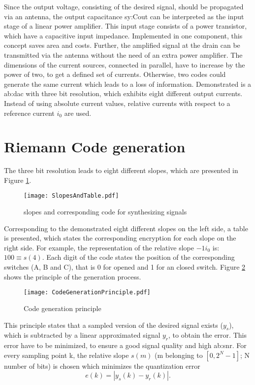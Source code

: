 Since the output voltage, consisting of the desired signal, should be propagated via an antenna, the output capacitance \gls{sy:Cout} can be interpreted as the input stage of a linear power amplifier. 
This input stage consists of a power transistor, which have a capacitive input impedance.
Implemented in one component, this concept saves area and costs.
Further, the amplified signal at the drain can be transmitted via the antenna without the need of an extra power amplifier.
The dimensions of the current sources, connected in parallel, have to increase by the power of two, to get a defined set of currents.
Otherwise, two codes could generate the same current which leads to a loss of information.
Demonstrated is a \gls{ab:dac} with three bit resolution, which exhibits eight different output currents.
Instead of using absolute current values, relative currents with respect to a reference current $i_0$ are used.

\newpage
\section{Riemann Code generation}
The three bit resolution leads to eight different slopes, which are presented in Figure \ref{fig:SlopesAndTable}.

\begin{figure}[H]
	\centering
  \texttt{[image: SlopesAndTable.pdf]}
	\caption{slopes and corresponding code for synthesizing signals}
	\label{fig:SlopesAndTable}
\end{figure}

Corresponding to the demonstrated eight different slopes on the left side, a table is presented, which states the corresponding encryption for each slope on the right side.
For example, the representation of the relative slope $-1 i_0$ is: $1 0 0 \equiv s(4)$.
Each digit of the code states the position of the corresponding switches (A, B and C), that is 0 for opened and 1 for an closed switch.
Figure \ref{fig:CodeGenerationPrinciple} shows the principle of the generation process.

 \begin{figure}[H]
	\centering
  \texttt{[image: CodeGenerationPrinciple.pdf]}
	\caption{Code generation principle}
	\label{fig:CodeGenerationPrinciple}
\end{figure}

This principle states that a sampled version of the desired signal exists ($y_s$), which is subtracted by a linear approximated signal $y_r$, to obtain the error.
This error have to be minimized, to ensure a good signal quality and high \gls{ab:snr}.
For every sampling point k, the relative slope $s(m)$ (m belonging to $[0,2^N-1]$; N number of bits) is chosen which minimizes the quantization error 
\begin{equation}
e(k) = | y_s(k) - y_r(k) |.
\label{eq:error}
\end{equation}

